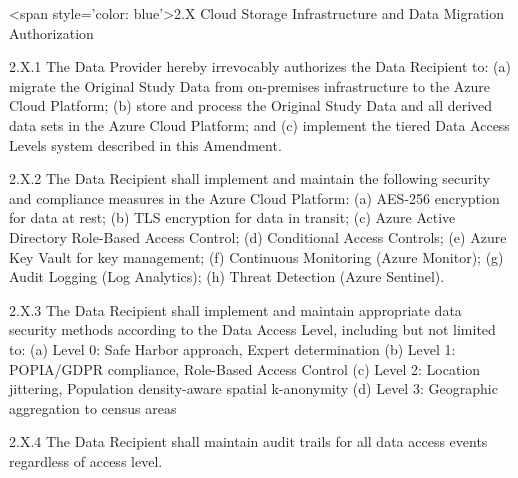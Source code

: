 \documentclass[12pt,letterpaper]{article}
\begin{document}
<span style='color: blue'>2.X Cloud Storage Infrastructure and Data Migration Authorization

2.X.1 The Data Provider hereby irrevocably authorizes the Data Recipient to: (a) migrate the Original Study Data from on-premises infrastructure to the Azure Cloud Platform; (b) store and process the Original Study Data and all derived data sets in the Azure Cloud Platform; and (c) implement the tiered Data Access Levels system described in this Amendment.

2.X.2 The Data Recipient shall implement and maintain the following security and compliance measures in the Azure Cloud Platform: (a) AES-256 encryption for data at rest; (b) TLS encryption for data in transit; (c) Azure Active Directory Role-Based Access Control; (d) Conditional Access Controls; (e) Azure Key Vault for key management; (f) Continuous Monitoring (Azure Monitor); (g) Audit Logging (Log Analytics); (h) Threat Detection (Azure Sentinel).

2.X.3 The Data Recipient shall implement and maintain appropriate data security methods according to the Data Access Level, including but not limited to: (a) Level 0: Safe Harbor approach, Expert determination (b) Level 1: POPIA/GDPR compliance, Role-Based Access Control (c) Level 2: Location jittering, Population density-aware spatial k-anonymity (d) Level 3: Geographic aggregation to census areas

2.X.4 The Data Recipient shall maintain audit trails for all data access events regardless of access level.
\end{document}
